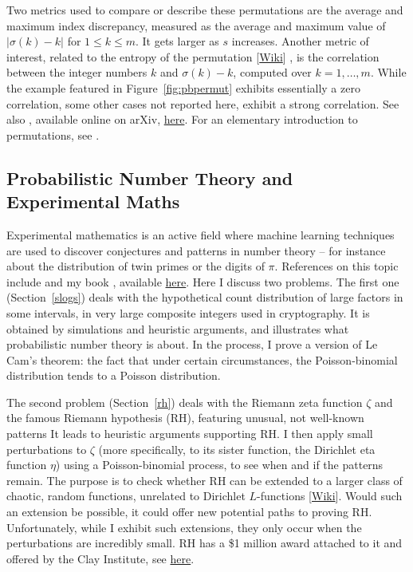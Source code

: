 \documentclass[10pt]{article}
\begin{document}
Two metrics used to compare or describe these permutations are the average and maximum \textcolor{index}{index discrepancy}, measured as the average and maximum value of $|\sigma(k)-k|$ for $1\leq k \leq m$. It gets larger as $s$ increases. Another metric of interest, related to the 
\textcolor{index}{entropy} of the permutation 
 [\href{https://www.aptech.com/blog/permutation-entropy/}{Wiki}] \cite {pentropy}, 
is the 
correlation between the integer numbers $k$ and $\sigma(k)-k$, computed over $k=1,\dots,m$.
While the example featured in Figure~\ref{fig:pbpermut} exhibits essentially a zero correlation, some other cases not reported here, exhibit a strong correlation. See also \cite{pentrop2}, available online on arXiv, \href{https://arxiv.org/abs/2003.13728}{here}. For an elementary introduction to permutations, see \cite{introp}.


\subsection{Probabilistic Number Theory and Experimental Maths}

Experimental mathematics is an active field where machine learning techniques are used to discover conjectures and patterns in number theory -- for instance about the distribution of twin primes or the digits of $\pi$. References on this topic include \cite{nt1,nt2,nt3} and my book \cite{vgdyn}, 
available \href{https://github.com/VincentGranville/Stochastic-Processes}{here}. Here I discuss two problems. The first one 
(Section~\ref{slogs}) deals with the hypothetical count distribution of large factors  in some intervals, in very large composite integers used in cryptography. It is obtained by simulations and heuristic arguments, and illustrates what probabilistic number theory is about. In the process, I prove a version of Le Cam's theorem: the fact that under certain circumstances, the Poisson-binomial distribution tends to a Poisson distribution. 


The second problem (Section~\ref{rh}) deals with the \textcolor{index}{Riemann zeta function} $\zeta$ and the famous Riemann hypothesis (RH), featuring unusual, not well-known patterns  It leads to heuristic arguments supporting RH. I then apply small perturbations to $\zeta$ (more specifically, to its sister function, the \textcolor{index}{Dirichlet eta function} $\eta$) using a Poisson-binomial process, to see when and if the patterns remain. The purpose is to check whether RH can be extended to a larger class of chaotic, 
\textcolor{index}{random functions}, 
unrelated to Dirichlet $L$-functions [\href{https://en.wikipedia.org/wiki/L-function}{Wiki}]. Would such an extension be possible, it could offer new potential paths to proving RH. Unfortunately, while I exhibit such extensions, they only occur when the perturbations are incredibly small. RH has a \$1 million award attached to it and offered by the Clay Institute, see \href{https://www.claymath.org/millennium-problems/}{here}.
\end{document}
